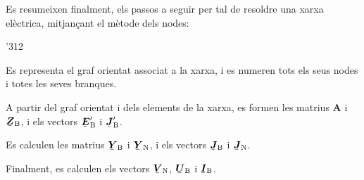 Es resumeixen finalment, els passos a seguir per tal de resoldre una xarxa el\`{e}ctrica, mitjan\c{c}ant el m\`{e}tode dels nodes:
\begin{dingautolist}{'312}
   \item Es representa el graf orientat associat a la xarxa, i es numeren tots els seus nodes i totes les seves branques.
   \item A partir del graf orientat i dels elements de la xarxa, es formen les matrius $\boldsymbol{A}$ i $\mcmplx{Z}\ped{B}$, i els vectors $\mcmplx{E}\ped{B}'$ i $\mcmplx{J}\ped{B}'$.
   \item Es calculen les matrius $\mcmplx{Y}\ped{B}$ i $\mcmplx{Y}\ped{N}$, i els vectors $\mcmplx{J}\ped{B}$ i $\mcmplx{J}\ped{N}$.
   \item Finalment, es calculen els vectors $\mcmplx{V}\ped{N}$, $\mcmplx{U}\ped{B}$ i $\mcmplx{I}\ped{B}$.
\end{dingautolist}

